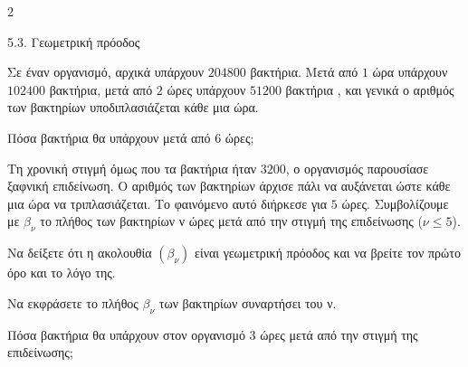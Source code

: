\begin{ylh}{2}
    \item 5.3. Γεωμετρική πρόοδος
\end{ylh}
Σε έναν οργανισμό, αρχικά υπάρχουν $204800$ βακτήρια. Μετά από $1$ ώρα υπάρχουν $102400$ βακτήρια, μετά από $2$ ώρες υπάρχουν $51200$ βακτήρια , και γενικά ο αριθμός των βακτηρίων υποδιπλασιάζεται κάθε μια ώρα.

\begin{alist}
\item Πόσα βακτήρια θα υπάρχουν μετά από $6$ ώρες;
\item Τη χρονική στιγμή όμως που τα βακτήρια ήταν $3200$, ο οργανισμός παρουσίασε ξαφνική επιδείνωση. Ο αριθμός των βακτηρίων άρχισε πάλι να αυξάνεται ώστε κάθε μια ώρα να τριπλασιάζεται. Το φαινόμενο αυτό διήρκεσε για $5$ ώρες. Συμβολίζουμε με $\beta_\nu$ το πλήθος των βακτηρίων ν ώρες μετά από την στιγμή της επιδείνωσης ($\nu \le 5$).
\begin{rlist}
\item
  Να δείξετε ότι η ακολουθία $(\beta_\nu)$ είναι γεωμετρική πρόοδος και να βρείτε τον πρώτο όρο και το λόγο της.
\item
  Να εκφράσετε το πλήθος $\beta_\nu$ των βακτηρίων συναρτήσει του ν.
\item
  Πόσα βακτήρια θα υπάρχουν στον οργανισμό $3$ ώρες μετά από την στιγμή της επιδείνωσης;
\end{rlist}
\end{alist}


